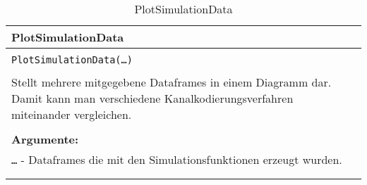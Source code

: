 \begin{longtable}{|p{\textwidth}|}
\hline
\rowcolor{lightblue}
PlotSimulationData\\
\hline
\\
\texttt{PlotSimulationData(\dots)}\\
\\
Stellt mehrere mitgegebene Dataframes in einem Diagramm dar. Damit kann man verschiedene Kanalkodierungsverfahren miteinander vergleichen.\\
\\
\textbf{Argumente:}\\
\texttt{\dots} - Dataframes die mit den Simulationsfunktionen erzeugt wurden.\\	
\\
\hline
\caption{PlotSimulationData}
\label{func:plot}
\end{longtable}
